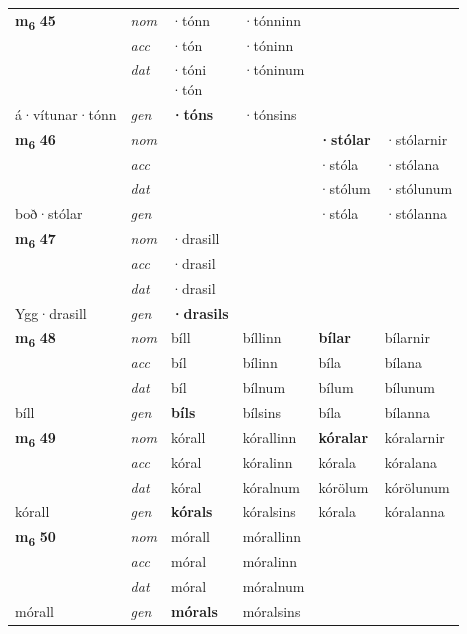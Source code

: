 \begin{longtable}[l]{X>{\footnotesize\itshape}XXXXX}
\multirow{3}{*}{{{\textbf{m{\textsubscript{6}}} \Large{\textbf{45}}}}} & nom & ·tónn & ·tónninn & \textbf{} &  \\*
 & acc & ·tón & ·tóninn &  &  \\*
 & dat & \specialcell{·tóni\\  ·tón} & ·tóninum &  &  \\*
 {\footnotesize{á\allowbreak ·vítunar\allowbreak ·tónn}} & gen & \textbf{·tóns} & ·tónsins &  &  \\
\cmidrule{1-6}

\multirow{3}{*}{{{\textbf{m{\textsubscript{6}}} \Large{\textbf{46}}}}} & nom &  &  & \textbf{·stólar} & ·stólarnir \\*
 & acc &  &  & ·stóla & ·stólana \\*
 & dat &  &  & ·stólum & ·stólunum \\*
 {\footnotesize{boð\allowbreak ·stólar}} & gen & \textbf{} &  & ·stóla & ·stólanna \\
\cmidrule{1-6}

\multirow{3}{*}{{{\textbf{m{\textsubscript{6}}} \Large{\textbf{47}}}}} & nom & ·drasill &  & \textbf{} &  \\*
 & acc & ·drasil &  &  &  \\*
 & dat & ·drasil &  &  &  \\*
 {\footnotesize{Ygg\allowbreak ·drasill}} & gen & \textbf{·drasils} &  &  &  \\
\cmidrule{1-6}

\multirow{3}{*}{{{\textbf{m{\textsubscript{6}}} \Large{\textbf{48}}}}} & nom & bíll & bíllinn & \textbf{bílar} & bílarnir \\*
 & acc & bíl & bílinn & bíla & bílana \\*
 & dat & bíl & bílnum & bílum & bílunum \\*
 {\footnotesize{bíll}} & gen & \textbf{bíls} & bílsins & bíla & bílanna \\

\multirow{3}{*}{{{\textbf{m{\textsubscript{6}}} \Large{\textbf{49}}}}} & nom & kórall & kórallinn & \textbf{kóralar} & kóralarnir \\*
 & acc & kóral & kóralinn & kórala & kóralana \\*
 & dat & kóral & kóralnum & kórölum & kórölunum \\*
 {\footnotesize{kórall}} & gen & \textbf{kórals} & kóralsins & kórala & kóralanna \\
\cmidrule{1-6}

\multirow{3}{*}{{{\textbf{m{\textsubscript{6}}} \Large{\textbf{50}}}}} & nom & mórall & mórallinn & \textbf{} &  \\*
 & acc & móral & móralinn &  &  \\*
 & dat & móral & móralnum &  &  \\*
 {\footnotesize{mórall}} & gen & \textbf{mórals} & móralsins &  &  \\
\cmidrule{1-6}


\end{longtable}
